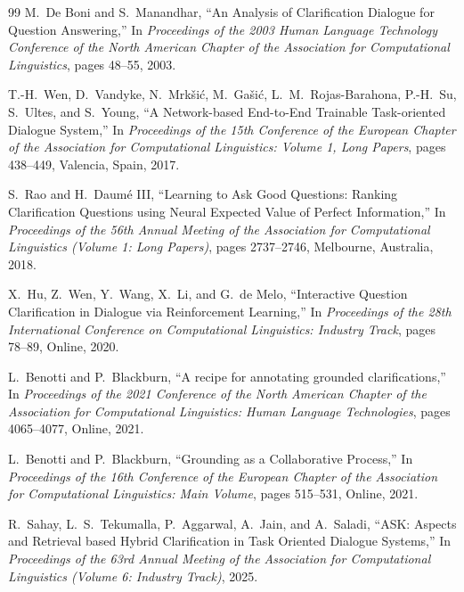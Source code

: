 \documentclass[11pt]{article}
\begin{document}
\begin{thebibliography}{99}
M.~De Boni and S.~Manandhar,
\newblock ``An Analysis of Clarification Dialogue for Question Answering,''
\newblock In \emph{Proceedings of the 2003 Human Language Technology Conference of the North American Chapter of the Association for Computational Linguistics}, pages 48--55, 2003.

T.-H.~Wen, D.~Vandyke, N.~Mrk{\v{s}}i{\'c}, M.~Ga{\v{s}}i{\'c}, L.~M.~Rojas-Barahona, P.-H.~Su, S.~Ultes, and S.~Young,
\newblock ``A Network-based End-to-End Trainable Task-oriented Dialogue System,''
\newblock In \emph{Proceedings of the 15th Conference of the European Chapter of the Association for Computational Linguistics: Volume 1, Long Papers}, pages 438--449, Valencia, Spain, 2017.

S.~Rao and H.~Daum{\'e} III,
\newblock ``Learning to Ask Good Questions: Ranking Clarification Questions using Neural Expected Value of Perfect Information,''
\newblock In \emph{Proceedings of the 56th Annual Meeting of the Association for Computational Linguistics (Volume 1: Long Papers)}, pages 2737--2746, Melbourne, Australia, 2018.

X.~Hu, Z.~Wen, Y.~Wang, X.~Li, and G.~de Melo,
\newblock ``Interactive Question Clarification in Dialogue via Reinforcement Learning,''
\newblock In \emph{Proceedings of the 28th International Conference on Computational Linguistics: Industry Track}, pages 78--89, Online, 2020.

L.~Benotti and P.~Blackburn,
\newblock ``A recipe for annotating grounded clarifications,''
\newblock In \emph{Proceedings of the 2021 Conference of the North American Chapter of the Association for Computational Linguistics: Human Language Technologies}, pages 4065--4077, Online, 2021.

L.~Benotti and P.~Blackburn,
\newblock ``Grounding as a Collaborative Process,''
\newblock In \emph{Proceedings of the 16th Conference of the European Chapter of the Association for Computational Linguistics: Main Volume}, pages 515--531, Online, 2021.

R.~Sahay, L.~S.~Tekumalla, P.~Aggarwal, A.~Jain, and A.~Saladi,
\newblock ``ASK: Aspects and Retrieval based Hybrid Clarification in Task Oriented Dialogue Systems,''
\newblock In \emph{Proceedings of the 63rd Annual Meeting of the Association for Computational Linguistics (Volume 6: Industry Track)}, 2025.


\end{thebibliography}
\end{document}
